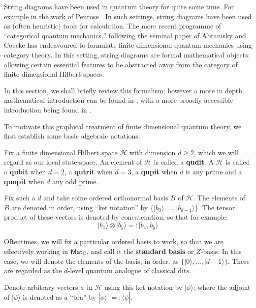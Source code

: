 

String diagrams have been used in quantum theory for quite some time.  For example in the work of Penrose \cite{penrosei}.  In such settings, string diagrams have been used as (often heuristic) tools for calculation. The more recent programme of ``categorical quantum mechanics,'' following the seminal paper of Abramsky and Coecke \cite{abramsky} has endeavoured to formulate finite dimensional quantum mechanics using category theory.  In this setting,  string diagrams are formal mathematical objects: allowing certain essential features to be abstracted away from the category of finite dimensional Hilbert spaces.

In this section, we shall briefly review this formalism; however a more in depth mathematical introduction can be found in \cite{heunen}, with a more broadly accessible introduction being found in \cite{pqp}.


To motivate this graphical treatment of finite dimensional quantum theory, we first establish some basic algebraic notations.


Fix a finite dimensional Hilbert space $\mathcal H$ with dimension $d\geq 2$, which we will regard as our local state-space. An element of $\mathcal H$ is called a {\bf qudit}.  A $\mathcal H$ is called a {\bf qubit} when $d=2$, a {\bf qutrit} when $d=3$, a {\bf qupit} when $d$ is any prime and a {\bf quopit} when $d$ any odd prime.

Fix such a $d$ and take some ordered orthonormal basis $B$ of $\mathcal H$.  The elements of $B$ are denoted in order, using ``ket notation'' by $\{| b_0\rangle , \ldots, |b_{d-1}\rangle \}$.
The tensor product of these vectors is denoted by concatenation, so that for example:
$$
| b_x \rangle \otimes | b_y\rangle =: |b_x,b_y \rangle  
$$


Oftentimes, we will fix a particular ordered basis to work, so that we are effectively working in $\mathsf{Mat}_{\mathbb{C}}$, and call it the {\bf standard basis} or $Z$-basis.  In this case, we will denote the elements of the basis, in order, as  $\{| 0\rangle , \ldots, |d-1\rangle \}$.  These are regarded as the $d$-level quantum analogue of classical dits.

Denote arbitrary vectors $\phi$ in $\mathcal H$ using this ket notation by $|\phi \rangle$; where the adjoint of $|\phi \rangle$ is denoted as a ``bra''  by $|\phi \rangle^\dag =: \langle \phi |$. 


